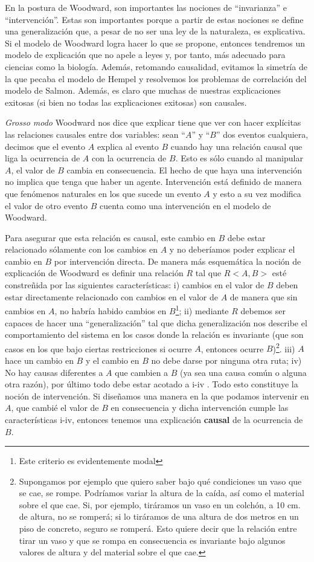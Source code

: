En la postura de Woodward, son importantes las nociones de ``invarianza'' e ``intervención''. Estas son importantes porque a partir de estas nociones se define una generalización que, a pesar de no ser una ley de la naturaleza, es explicativa. Si el modelo de Woodward logra hacer lo que se propone, entonces tendremos un modelo de explicación que no apele a leyes y, por tanto, más adecuado para ciencias como la biología. Además, retomando causalidad, evitamos la simetría de la que pecaba el modelo de Hempel y resolvemos los problemas de correlación del modelo de Salmon. Además, es claro que muchas de nuestras explicaciones exitosas (si bien no todas las explicaciones exitosas) son causales.

\textit{Grosso modo} Woodward nos dice que explicar tiene que ver con hacer explícitas las relaciones causales entre dos variables: sean ``$A$'' y ``$B$'' dos eventos cualquiera, decimos que el evento $A$ explica al evento $B$ cuando hay una relación causal que liga la ocurrencia de $A$ con la ocurrencia de $B$. Esto es sólo cuando al manipular $A$, el valor de $B$ cambia en consecuencia. El hecho de que haya una intervención no implica que tenga que haber un agente. Intervención está definido de manera que fenómenos naturales en los que sucede un evento $A$ y esto a su vez modifica el valor de otro evento $B$ cuenta como una intervención en el modelo de Woodward.

Para asegurar que esta relación es causal, este cambio en $B$ debe estar relacionado sólamente con los cambios en $A$ y no deberíamos poder explicar el cambio en $B$ por intervención directa. De manera más esquemática la noción de explicación de Woodward es definir una relación $R$ tal que $R<A, B>$ esté constreñida por las siguientes características: i) cambios en el valor de $B$ deben estar directamente relacionado con cambios en el valor de $A$ de manera que sin cambios en $A$, no habría habido cambios en $B$\footnote{Este criterio es evidentemente modal}; ii) mediante $R$ debemos ser capaces de hacer una ``generalización'' tal que dicha generalización nos describe el comportamiento del sistema en los casos donde la relación es invariante (que son casos en los que bajo ciertas restricciones si ocurre $A$, entonces ocurre $B$)\footnote{Supongamos por ejemplo que quiero saber bajo qué condiciones un vaso que se cae, se rompe. Podríamos variar la altura de la caída, así como el material sobre el que cae. Si, por ejemplo, tiráramos un vaso en un colchón, a 10 cm. de altura, no se romperá; si lo tiráramos de una altura de dos metros en un piso de concreto, seguro se romperá. Esto quiere decir que la relación entre tirar un vaso y que se rompa en consecuencia es invariante bajo algunos valores de altura y del material sobre el que cae.}.  iii) $A$ hace un cambio en $B$ y el cambio en $B$ no debe darse por ninguna otra ruta; iv) No hay causas diferentes a $A$ que cambien a $B$ (ya sea una causa común o alguna otra razón), por último todo debe estar acotado a i-iv \cite[p. 201]{Woodward2000}. Todo esto constituye la noción de intervención. Si diseñamos una manera en la que podamos intervenir en $A$, que cambié el valor de $B$ en consecuencia y dicha intervención cumple las características i-iv, entonces tenemos una explicación \textbf{causal} de la ocurrencia de $B$.

